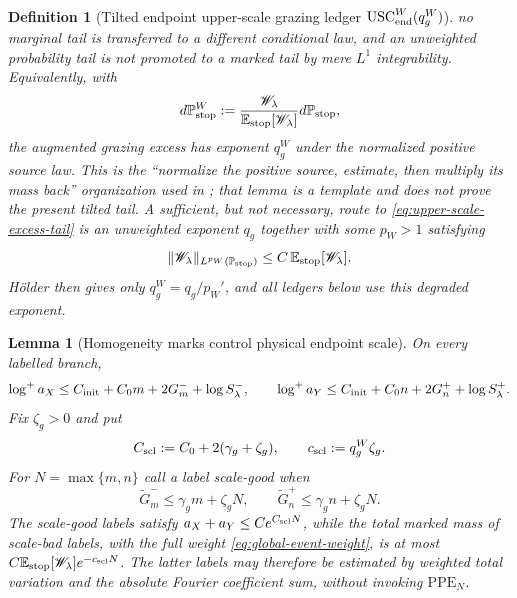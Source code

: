 \documentclass[11pt]{article}
\newtheorem{lemma}[theorem]{Lemma}
\newtheorem{definition}[theorem]{Definition}
\begin{document}
\begin{definition}[Tilted endpoint upper-scale grazing ledger
$\mathrm{USC}_{\rm end}^{W}(q_g^W)$]
no marginal tail is transferred to a different conditional law, and an
unweighted probability tail is not promoted to a marked tail by mere
$L^1$ integrability.  Equivalently, with
\[
 d\mathbb P_{\rm stop}^{W}
 :=\frac{\mathscr W_\lambda}
 {\mathbb E_{\rm stop}[\mathscr W_\lambda]}
 d\mathbb P_{\rm stop},
\]
the augmented grazing excess has exponent $q_g^W$ under the normalized
positive source law.  This is the ``normalize the positive source, estimate,
then multiply its mass back'' organization used in
\cite[Lemma~5.10]{CanestrariHoles}; that lemma is a template and does not
prove the present tilted tail.  A sufficient, but not necessary, route to
\eqref{eq:upper-scale-excess-tail} is an unweighted exponent $q_g$ together
with some $p_W>1$ satisfying
\begin{equation}
\label{eq:USC-holder-sufficient-condition}
 \|\mathscr W_\lambda\|_{L^{p_W}(\mathbb P_{\rm stop})}
 \le C\,\mathbb E_{\rm stop}[\mathscr W_\lambda].
\end{equation}
H\"older then gives only $q_g^W=q_g/p_W'$, and all ledgers below use this
degraded exponent.
\end{definition}

\begin{lemma}[Homogeneity marks control physical endpoint scale]
\label{lem:endpoint-upper-scale}
On every labelled branch,
\begin{equation}
\label{eq:endpoint-upper-scale-growth}
 \log^+a_X\le C_{\rm init}+C_0m+2G_m^-+\log S_\lambda^-,
 \qquad
 \log^+a_Y\le C_{\rm init}+C_0n+2G_n^++\log S_\lambda^+.
\end{equation}
Fix $\zeta_g>0$ and put
\begin{equation}
\label{eq:scale-good-constants}
 C_{\rm scl}:=C_0+2(\gamma_g+\zeta_g),\qquad
 c_{\rm scl}:=q_g^W\zeta_g.
\end{equation}
For $N=\max\{m,n\}$ call a label scale-good when
\begin{equation}
\label{eq:weighted-scale-good-event}
 \widetilde G_m^-\le\gamma_gm+\zeta_gN,
 \qquad
 \widetilde G_n^+\le\gamma_gn+\zeta_gN.
\end{equation}
The scale-good labels satisfy
$a_X+a_Y\le Ce^{C_{\rm scl}N}$, while the total marked mass of scale-bad
labels, with the full weight \eqref{eq:global-event-weight}, is at most
$C\mathbb E_{\rm stop}[\mathscr W_\lambda]e^{-c_{\rm scl}N}$.  The latter
labels may therefore be estimated by weighted total variation and the
absolute Fourier coefficient sum, without invoking $\mathrm{PPE}_{N}$.
\end{lemma}
\end{document}
